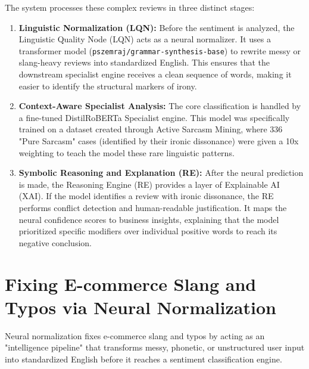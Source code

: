 \documentclass[11pt,oneside]{scrbook}
\begin{document}
The system processes these complex reviews in three distinct stages:
\begin{enumerate}
    \item \textbf{Linguistic Normalization (LQN):} Before the sentiment is analyzed, the Linguistic Quality Node (LQN) acts as a neural normalizer. It uses a transformer model (\texttt{pszemraj/grammar-synthesis-base}) to rewrite messy or slang-heavy reviews into standardized English. This ensures that the downstream specialist engine receives a clean sequence of words, making it easier to identify the structural markers of irony.
    \item \textbf{Context-Aware Specialist Analysis:} The core classification is handled by a fine-tuned DistilRoBERTa Specialist engine. This model was specifically trained on a dataset created through Active Sarcasm Mining, where 336 "Pure Sarcasm" cases (identified by their ironic dissonance) were given a 10x weighting to teach the model these rare linguistic patterns.
    \item \textbf{Symbolic Reasoning and Explanation (RE):} After the neural prediction is made, the Reasoning Engine (RE) provides a layer of Explainable AI (XAI). If the model identifies a review with ironic dissonance, the RE performs conflict detection and human-readable justification. It maps the neural confidence scores to business insights, explaining that the model prioritized specific modifiers over individual positive words to reach its negative conclusion.
\end{enumerate}

\section{Fixing E-commerce Slang and Typos via Neural Normalization}
Neural normalization fixes e-commerce slang and typos by acting as an "intelligence pipeline" that transforms messy, phonetic, or unstructured user input into standardized English before it reaches a sentiment classification engine. 
\end{document}
